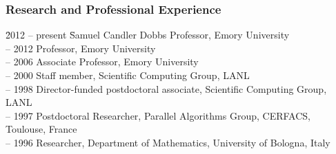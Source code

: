 \subsubsection*{Research and Professional Experience}
\vspace*{-1ex}
\begin{tabbing}
  \hspace*{1ex} 
  \= 2012 -- present \hspace*{2ex} \= Samuel Candler Dobbs Professor, Emory
  University\\
   -- 2012 \> Professor, Emory University\\ 
   -- 2006 \> Associate Professor, Emory University \\
   -- 2000 \> Staff member, Scientific Computing Group, LANL \\ 
   -- 1998 \> Director-funded postdoctoral associate, Scientific 
  Computing Group, LANL\\
   -- 1997 \> Postdoctoral Researcher, Parallel Algorithms Group,
  CERFACS, Toulouse, France\\
   -- 1996 \>  Researcher, Department of Mathematics, University of Bologna,
  Italy
\end{tabbing}


\vspace*{-3ex}
